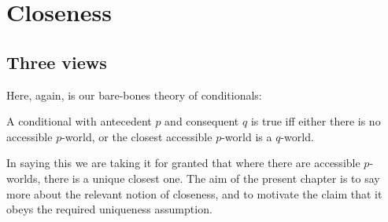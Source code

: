 \documentclass[If.tex]{subfiles}
\begin{document}
\chapter{Closeness}
\label{chap:cem}

\begin{comment}
	\begin{itemize}
		\item
		Other arguments for CEM: Neg-raising and small differences.
		(What were we thinking here?  Maybe the idea is that the CEM-lover can explain why we are as careless as we are about the placement of ‘not’, whereas for strictists it should be analogous to the case of ‘have to’ where there is no temptation to conflate ‘don't have to’ with ‘have to not’.  Not sure if there's really a whole separate argument here.)
		\item
		The super-contextualist response [response to what exactly?]. It has to posit lots of mid-sentence context-shifts in cases where it seems really implausible.
		\item
		Just a footnote on the terrible Reverse Sobel Sequence argument for strictism - appeal to Moss.
		\item
		The deepest considerations in favour of strictism come from the desire to have a uniform treatment of propositional conditionals and conditionals with adverbs of quantification. We'll get to this in a later chapter.
		\item
		Does Kratzer have any arguments that the hidden operator in indicatives is ‘must’-like? One could make an argument from the premise that we never see a \emph{lexicalised} modal that is epistemic but has the kind of ordering source feel that would be required by a CEM lover.
	\end{itemize}
\end{comment}


\section{Three views}\label{why-closest}
Here, again, is our bare-bones theory of conditionals:
\begin{prop}
\litem[CLOSEST] \label{closest}
	A conditional with antecedent $p$ and consequent $q$ is true iff either there is no accessible $p$-world, or the closest accessible $p$-world is a $q$-world.
\end{prop}
In saying this we are taking it for granted that where there are accessible $p$-worlds, there is a unique closest one. The aim of the present chapter is to say more about the relevant notion of closeness, and to motivate the claim that it obeys the required uniqueness assumption.
\end{document}
